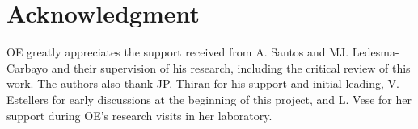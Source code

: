 \section*{Acknowledgment}
OE greatly appreciates the support received from A. Santos and
  MJ. Ledesma-Carbayo and their supervision of his research, including
  the critical review of this work.
The authors also thank JP. Thiran for his support and initial leading,
  V. Estellers for early discussions at the beginning of this project,
  and L. Vese for her support during OE's research visits in her
  laboratory.
